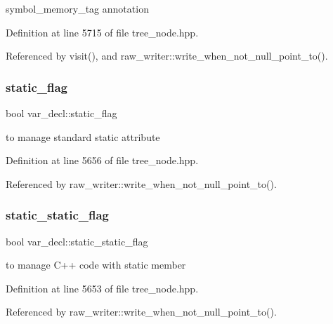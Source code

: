 symbol\+\_\+memory\+\_\+tag annotation 



Definition at line 5715 of file tree\+\_\+node.\+hpp.



Referenced by visit(), and raw\+\_\+writer\+::write\+\_\+when\+\_\+not\+\_\+null\+\_\+point\+\_\+to().

\mbox{\label{structvar__decl_a58ea3e21cd906a53ea4fcc07b642288d}} 
\subsubsection{\texorpdfstring{static\+\_\+flag}{static\_flag}}
{\footnotesize\ttfamily bool var\+\_\+decl\+::static\+\_\+flag}



to manage standard static attribute 



Definition at line 5656 of file tree\+\_\+node.\+hpp.



Referenced by raw\+\_\+writer\+::write\+\_\+when\+\_\+not\+\_\+null\+\_\+point\+\_\+to().

\mbox{\label{structvar__decl_aff775359d2600674ebb3db1bd469aa9a}} 
\subsubsection{\texorpdfstring{static\+\_\+static\+\_\+flag}{static\_static\_flag}}
{\footnotesize\ttfamily bool var\+\_\+decl\+::static\+\_\+static\+\_\+flag}



to manage C++ code with static member 



Definition at line 5653 of file tree\+\_\+node.\+hpp.



Referenced by raw\+\_\+writer\+::write\+\_\+when\+\_\+not\+\_\+null\+\_\+point\+\_\+to().

\mbox{\label{structvar__decl_a3b4eaf4a3739c99e3fb40989053b7205}} 
